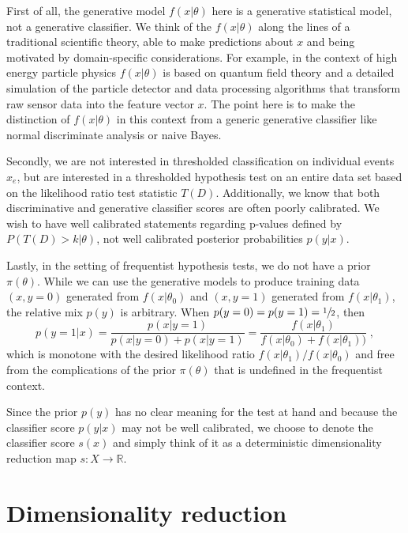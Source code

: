 \documentclass[11pt, oneside]{article}   	%
\begin{document}
First of all, the generative model $f(x|\theta)$ here is a generative statistical model, not a generative classifier. We think of the  $f(x|\theta)$ along the lines of a traditional scientific theory, able to make predictions about $x$ and being motivated by domain-specific considerations. For example, in the context of high energy particle physics $f(x|\theta)$ is based on quantum field theory and a detailed simulation of the particle detector and data processing algorithms that transform raw sensor data into the feature vector $x$. The point here is to make the distinction of $f(x|\theta)$ in this context from a generic generative classifier like normal discriminate analysis or naive Bayes. 

Secondly, we are not interested in thresholded classification on individual events $x_e$, but are interested in a thresholded hypothesis test on an entire data set based on the likelihood ratio test statistic $T(D)$.  
Additionally, we know that both discriminative and generative classifier scores are often poorly calibrated. 
We wish to have well calibrated statements regarding p-values defined by $P(T(D) > k |\theta)$, not well calibrated posterior probabilities $p(y|x)$.

Lastly, in the setting of frequentist hypothesis tests, we do not have a prior $\pi(\theta)$. 
While we can use the generative models to produce training data $(x,y=0)$ generated 
from $f(x|\theta_0)$ and $(x,y=1)$ generated from $f(x|\theta_1)$, the relative mix $p(y)$ 
is arbitrary.  When $p(y=0)=p(y=1)=\sfrac{1}{2}$, then 
\begin{equation}
p(y=1 | x) = \frac{p(x|y=1)}{p(x|y=0)+p(x|y=1)} = \frac{f(x|\theta_1)}{f(x|\theta_0)+f(x|\theta_1))} \;,
\end{equation}
which is monotone with the desired likelihood ratio $f(x|\theta_1)/f(x|\theta_0)$ and free from the
complications of the prior $\pi(\theta)$ that is undefined in the frequentist context.

Since the prior $p(y)$ has no clear meaning for the test at hand and because the classifier score $p(y|x)$ may not be well calibrated, we choose to denote the classifier score $s(x)$ and simply think of it as a deterministic dimensionality reduction map $s: X \to \mathbb{R}$. 



\section{Dimensionality reduction}
\end{document}
